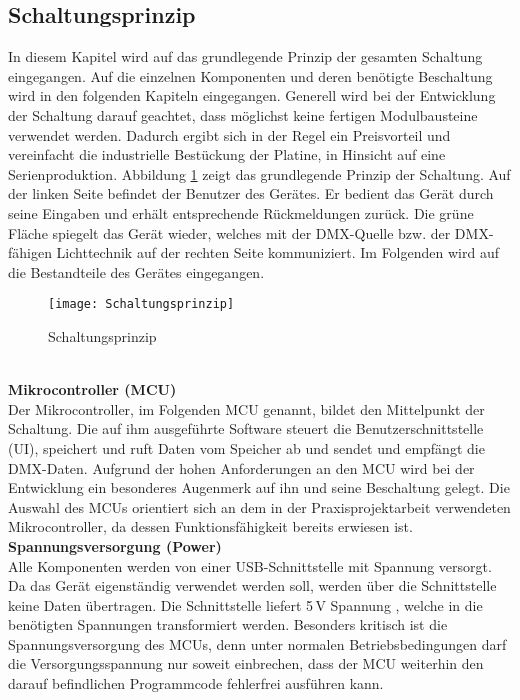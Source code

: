 
\subsection{Schaltungsprinzip}

In diesem Kapitel wird auf das grundlegende Prinzip der gesamten Schaltung eingegangen. Auf die einzelnen Komponenten und deren benötigte Beschaltung wird in den folgenden Kapiteln eingegangen. Generell wird bei der Entwicklung der Schaltung darauf geachtet, dass möglichst keine fertigen Modulbausteine verwendet werden. Dadurch ergibt sich in der Regel ein Preisvorteil und vereinfacht die industrielle Bestückung der Platine, in Hinsicht auf eine Serienproduktion. %
Abbildung \ref{fig:Schaltungsrinzip} zeigt das grundlegende Prinzip der Schaltung. Auf der linken Seite befindet der Benutzer des Gerätes. Er bedient das Gerät durch seine Eingaben und erhält entsprechende Rückmeldungen zurück. Die grüne Fläche spiegelt das Gerät wieder, welches mit der DMX-Quelle bzw. der DMX-fähigen Lichttechnik auf der rechten Seite kommuniziert. Im Folgenden wird auf die Bestandteile des Gerätes eingegangen.
\begin{figure}[h]
	\texttt{[image: Schaltungsprinzip]}
	\caption{Schaltungsprinzip}
	\label{fig:Schaltungsrinzip}
\end{figure}\\
\textbf{Mikrocontroller (MCU)}\\
Der Mikrocontroller, im Folgenden MCU genannt, bildet den Mittelpunkt der Schaltung. Die auf ihm ausgeführte Software steuert die Benutzerschnittstelle (UI), speichert und ruft Daten vom Speicher ab und sendet und empfängt die DMX-Daten. Aufgrund der hohen Anforderungen an den MCU wird bei der Entwicklung ein besonderes Augenmerk auf ihn und seine Beschaltung gelegt. Die Auswahl des MCUs orientiert sich an dem in der Praxisprojektarbeit verwendeten Mikrocontroller, da dessen Funktionsfähigkeit bereits erwiesen ist.\\
\newline
\textbf{Spannungsversorgung (Power)}\\
Alle Komponenten werden von einer USB-Schnittstelle mit Spannung versorgt. Da das Gerät eigenständig verwendet werden soll, werden über die Schnittstelle keine Daten übertragen. Die Schnittstelle liefert 5\,V Spannung \cite[S. 44]{USB-Battery}, welche in die benötigten Spannungen transformiert werden. Besonders kritisch ist die Spannungsversorgung des MCUs, denn unter normalen Betriebsbedingungen darf die Versorgungsspannung nur soweit einbrechen, dass der MCU weiterhin den darauf befindlichen Programmcode fehlerfrei ausführen kann.\\
